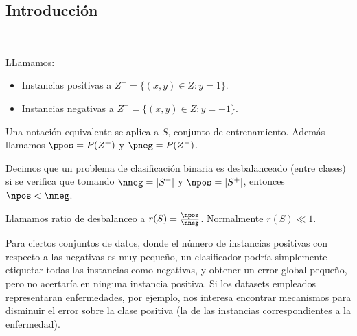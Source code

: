 \subsection{Introducción}
 \begin{frame}\
 \begin{definition}
 LLamamos:
 \begin{itemize}
  \item Instancias positivas a $Z^{+} = \{(x,y)\in Z: y=1\}$.
  \item Instancias negativas a $Z^{-} = \{(x,y)\in Z: y=-1\}$.
 \end{itemize}
 Una notación equivalente se aplica a $S$, conjunto de entrenamiento. Además llamamos $\ppos = P(Z^{+})$ y $\pneg = P(Z^{-})$.
 \end{definition}

 \begin{definition}
  Decimos que un problema de clasificación binaria es desbalanceado (entre clases) si se verifica que tomando 
  $\nneg = |S^{-}|$ y $\npos = |S^{+}|$, entonces $\npos < \nneg$.
  
  Llamamos ratio de desbalanceo a $r(S)=\frac{\npos}{\nneg}$. Normalmente $r(S) \ll 1$.
 \end{definition}

 Para ciertos conjuntos de datos, donde el número de instancias positivas con respecto a las negativas es muy pequeño, un clasificador podría simplemente
 etiquetar todas las instancias como negativas, y obtener un error global pequeño, pero no acertaría en ninguna instancia
 positiva. Si los datasets empleados representaran enfermedades, por ejemplo,
 nos interesa encontrar mecanismos para disminuir el error sobre la clase positiva (la de las instancias correspondientes
 a la enfermedad).
\end{frame}

